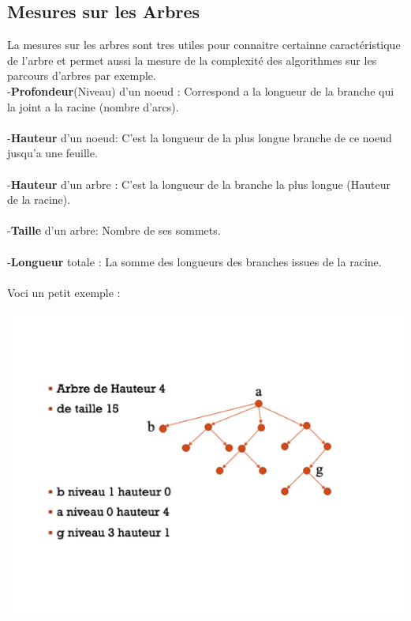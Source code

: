 \documentclass[a4paper,12pt,openany]{book}
\begin{document}
\subsection{Mesures sur les Arbres}

La mesures sur les arbres sont tres utiles pour connaitre certainne caractéristique de l'arbre et permet aussi la mesure de la complexité des algorithmes sur les parcours d'arbres par exemple.\\

-\textbf{Profondeur}(Niveau) d'un noeud : Correspond a la longueur de la branche qui la joint a la racine (nombre d'arcs).\\
\\
-\textbf{Hauteur} d'un noeud: C'est la longueur de la plus longue branche de ce noeud jusqu'a une feuille.\\
\\
-\textbf{Hauteur} d'un arbre : C'est la longueur de la branche la plus longue (Hauteur de la racine).\\
\\
-\textbf{Taille} d'un arbre: Nombre de ses sommets.\\
\\
-\textbf{Longueur} totale : La somme des longueurs des branches issues de la racine.\\
\\
Voci un petit exemple :\\
\\
\includegraphics[width=1\linewidth,center]{img/exemple_mesure_arbre.png}
\\
\end{document}
